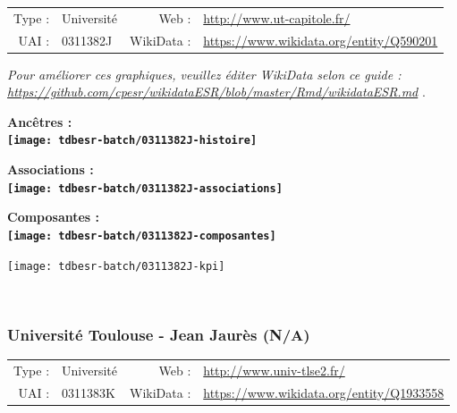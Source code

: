\documentclass[12pt,french,]{article}
\begin{document}
\begin{tabular*}{\textwidth}{rp{5cm}rl}  
\hline  
Type : & Université & Web : &\href{http://www.ut-capitole.fr/}{http://www.ut-capitole.fr/} \\  
UAI : & 0311382J & WikiData : & \href{https://www.wikidata.org/entity/Q590201}{https://www.wikidata.org/entity/Q590201} \\  
\hline  
\end{tabular*}

\textit{\scriptsize Pour améliorer ces graphiques, veuillez éditer WikiData selon ce guide :  \href{https://github.com/cpesr/wikidataESR/blob/master/Rmd/wikidataESR.md}{https://github.com/cpesr/wikidataESR/blob/master/Rmd/wikidataESR.md}}
.

\vspace{1cm}  
\begin{minipage}[b]{0.50\textwidth}\begin{center} \bf Ancêtres : \\  
\texttt{[image: tdbesr-batch/0311382J-histoire]} \end{center}\end{minipage}\begin{minipage}[b]{0.50\textwidth}\begin{center} \bf Associations : \\  
\texttt{[image: tdbesr-batch/0311382J-associations]} \end{center}\end{minipage}

\hrulefill

\begin{center} \bf Composantes : \\  
\texttt{[image: tdbesr-batch/0311382J-composantes]} \end{center}

\begin{center}\texttt{[image: tdbesr-batch/0311382J-kpi]} \end{center}\checkoddpage

\ifoddpage \fi ~\newpage  

\hypertarget{universituxe9-toulouse---jean-jauruxe8s-na}{%
\subsubsection{Université Toulouse - Jean Jaurès
(N/A)}\label{universituxe9-toulouse---jean-jauruxe8s-na}}

\begin{tabular*}{\textwidth}{rp{5cm}rl}  
\hline  
Type : & Université & Web : &\href{http://www.univ-tlse2.fr/}{http://www.univ-tlse2.fr/} \\  
UAI : & 0311383K & WikiData : & \href{https://www.wikidata.org/entity/Q1933558}{https://www.wikidata.org/entity/Q1933558} \\  
\hline  
\end{tabular*}
\end{document}
